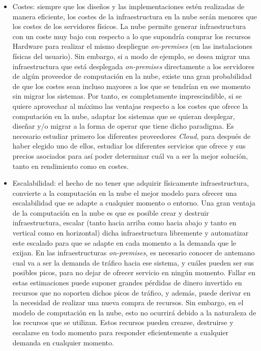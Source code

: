 \documentclass[../../memoria.tex]{subfiles}
\begin{document}
\begin{itemize}
    \item Costes: siempre que los diseños y las implementaciones estén realizadas de manera eficiente, los costes de la infraestructura en la nube serán menores que los costes de los servidores físicos. La nube permite generar infraestructura con un coste muy bajo con respecto a lo que supondría comprar los recursos Hardware para realizar el mismo despliegue \textit{on-premises} (en las instalaciones físicas del usuario). Sin embargo, si a modo de ejemplo, se desea migrar una infraestructura que está desplegada \textit{on-premises} directamente a los servidores de algún proveedor de computación en la nube, existe una gran probabilidad de que los costes sean incluso mayores a los que se tendrían en ese momento sin migrar los sistemas. Por tanto, es completamente imprescindible, si se quiere aprovechar al máximo las ventajas respecto a los costes que ofrece la computación en la nube, adaptar los sistemas que se quieran desplegar, diseñar y/o migrar a la forma de operar que tiene dicho paradigma. Es necesario estudiar primero los diferentes proveedores \textit{Cloud}, para después de haber elegido uno de ellos, estudiar los diferentes servicios que ofrece y sus precios asociados para así poder determinar cuál va a ser la mejor solución, tanto en rendimiento como en costes.

    \item Escalabilidad: el hecho de no tener que adquirir físicamente infraestructura, convierte a la computación en la nube el mejor modelo para ofrecer una escalabilidad que se adapte a cualquier momento o entorno. Una gran ventaja de la computación en la nube es que es posible crear y destruir infraestructura, escalar (tanto hacia arriba como hacia abajo y tanto en vertical como en horizontal) dicha infraestructura libremente y automatizar este escalado para que se adapte en cada momento a la demanda que le exijan. En las infraestructuras \textit{on-premises}, es necesario conocer de antemano cual va a ser la demanda de tráfico hacia ese sistema, y cuáles pueden ser sus posibles picos, para no dejar de ofrecer servicio en ningún momento. Fallar en estas estimaciones puede suponer grandes pérdidas de dinero invertido en recursos que no soporten dichos picos de tráfico, y además, puede derivar en la necesidad de realizar una nueva compra de recursos. Sin embargo, en el modelo de computación en la nube, esto no ocurrirá debido a la naturaleza de los recursos que se utilizan. Estos recursos pueden crearse, destruirse y escalarse en todo momento para responder eficientemente a cualquier demanda en cualquier momento.


\end{itemize}
\end{document}
